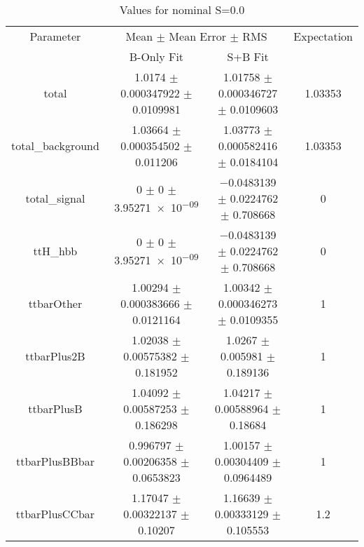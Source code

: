 \begin{table}
\centering
\caption{Values for nominal S=0.0}
\begin{tabular}{cccc}
\toprule
Parameter & \multicolumn{2}{c}{Mean $\pm$ Mean Error $\pm$ RMS} & Expectation\\
 & B-Only Fit & S+B Fit & \\
\midrule
total & \num{1.0174} $\pm$ \num{0.000347922} $\pm$ \num{0.0109981} & \num{1.01758} $\pm$ \num{0.000346727} $\pm$ \num{0.0109603} & \num{1.03353}\\
total\_background & \num{1.03664} $\pm$ \num{0.000354502} $\pm$ \num{0.011206} & \num{1.03773} $\pm$ \num{0.000582416} $\pm$ \num{0.0184104} & \num{1.03353}\\
total\_signal & \num{0} $\pm$ \num{0} $\pm$ \num{3.95271e-09} & \num{-0.0483139} $\pm$ \num{0.0224762} $\pm$ \num{0.708668} & \num{0}\\
ttH\_hbb & \num{0} $\pm$ \num{0} $\pm$ \num{3.95271e-09} & \num{-0.0483139} $\pm$ \num{0.0224762} $\pm$ \num{0.708668} & \num{0}\\
ttbarOther & \num{1.00294} $\pm$ \num{0.000383666} $\pm$ \num{0.0121164} & \num{1.00342} $\pm$ \num{0.000346273} $\pm$ \num{0.0109355} & \num{1}\\
ttbarPlus2B & \num{1.02038} $\pm$ \num{0.00575382} $\pm$ \num{0.181952} & \num{1.0267} $\pm$ \num{0.005981} $\pm$ \num{0.189136} & \num{1}\\
ttbarPlusB & \num{1.04092} $\pm$ \num{0.00587253} $\pm$ \num{0.186298} & \num{1.04217} $\pm$ \num{0.00588964} $\pm$ \num{0.18684} & \num{1}\\
ttbarPlusBBbar & \num{0.996797} $\pm$ \num{0.00206358} $\pm$ \num{0.0653823} & \num{1.00157} $\pm$ \num{0.00304409} $\pm$ \num{0.0964489} & \num{1}\\
ttbarPlusCCbar & \num{1.17047} $\pm$ \num{0.00322137} $\pm$ \num{0.10207} & \num{1.16639} $\pm$ \num{0.00333129} $\pm$ \num{0.105553} & \num{1.2}\\
\bottomrule
\end{tabular}
\end{table}